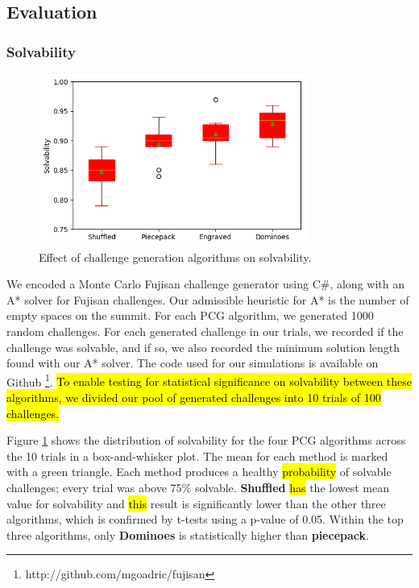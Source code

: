 \documentclass[journal]{IEEEtran}
\begin{document}
\subsection{Evaluation}

 \noindent


\subsubsection{Solvability}

\begin{figure}[t]
\includegraphics[width=8.8cm]{standalonesolve2.png}
\caption{Effect of challenge generation algorithms on solvability.}
\label{fig:strategycomp}
\end{figure}

We encoded a Monte Carlo Fujisan challenge generator using C\#, along with an A* solver for Fujisan challenges. Our admissible heuristic for A* is the number of empty spaces on the summit. For each PCG algorithm, we generated 1000 random challenges.
For each generated challenge in our trials, we recorded if the challenge was solvable, and if so, we also recorded the minimum solution length found with our A* solver. The code used for our simulations is available on Github \footnote{http://github.com/mgoadric/fujisan}. 
\hl{To enable testing for statistical significance on solvability between these algorithms, we divided our pool of generated challenges into 10 trials of 100 challenges. }
 
Figure \ref{fig:strategycomp} shows the distribution of solvability for the four PCG algorithms across the 10 trials in a box-and-whisker plot. The mean for each method is marked with a green triangle. Each method produces a healthy \hl{probability} of solvable challenges; every trial was above 75\% solvable. {\bf Shuffled} \hl{has} the lowest mean value for solvability and \hl{this} result is significantly lower than the other three algorithms, which is confirmed by t-tests using a p-value of 0.05. Within the top three algorithms, only {\bf Dominoes} is statistically higher than {\bf piecepack}. 
\end{document}
